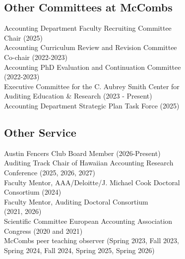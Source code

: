 \documentclass[]{deedy-resume-openfont}
\begin{document}
\begin{minipage}[t]{0.49\textwidth} 




\subsection{Other Committees at McCombs}
Accounting Department Faculty Recruiting Committee \\
\hspace*{.4cm} Chair (2025) \\
Accounting Curriculum Review and Revision Committee \\ 
\hspace*{.4cm} Co-chair (2022-2023)\\
Accounting PhD Evaluation and Continuation Committee \\ 
\hspace*{.4cm} (2022-2023)\\
Executive Committee for the C. Aubrey Smith Center 
for \\ 
\hspace*{.4cm} Auditing Education \& Research (2023 - Present) \\
Accounting Department Strategic Plan Task Force (2025) 
\sectionsep

\subsection{Other Service}
Austin Fencers Club Board Member (2026-Present) \\
Auditing Track Chair of Hawaiian Accounting Research \\ \hspace*{.4cm} Conference (2025, 2026, 2027) \\ 
Faculty Mentor, AAA/Deloitte/J. Michael Cook Doctoral \\ \hspace*{.4cm} Consortium (2024) \\
Faculty Mentor, Auditing Doctoral Consortium \\ \hspace*{.4cm}(2021, 2026) \\
Scientific Committee European Accounting Association \\ 
\hspace*{.4cm} Congress (2020 and 2021) \\
McCombs peer teaching observer (Spring 2023, Fall 2023,  \\ 
\hspace*{.4cm} Spring 2024, Fall 2024, Spring 2025, Spring 2026)



\sectionsep

\end{minipage}
\end{document}
